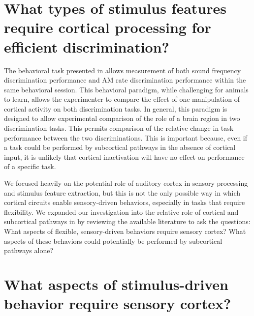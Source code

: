 \section{What types of stimulus features require cortical processing for efficient discrimination?}

The behavioral task presented in \ch{\Amod} allows measurement of both sound frequency discrimination performance and AM rate discrimination performance within the same behavioral session.
%
This behavioral paradigm, while challenging for animals to learn, allows the experimenter to compare the effect of one manipulation of cortical activity on both discrimination tasks. 
%
In general, this paradigm is designed to allow experimental comparison of the role of a brain region in two discrimination tasks. 
%
This permits comparison of the relative change in task performance between the two discriminations.
%
This is important because, even if a task could be performed by subcortical pathways in the absence of cortical input, it is unlikely that cortical inactivation will have no effect on performance of a specific task.
%

We focused heavily on the potential role of auditory cortex in sensory processing and stimulus feature extraction, but this is not the only possible way in which cortical circuits enable sensory-driven behaviors, especially in tasks that require flexibility. 
%
We expanded our investigation into the relative role of cortical and subcortical pathways in \ch{\Rev} by reviewing the available literature to ask the questions: What aspects of flexible, sensory-driven behaviors require sensory cortex? 
%
What aspects of these behaviors could potentially be performed by subcortical pathways alone?

\section{What aspects of stimulus-driven behavior require sensory cortex?}

